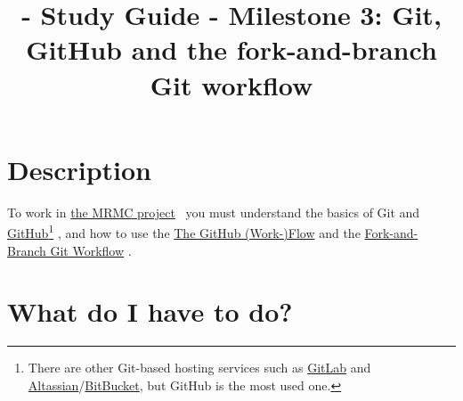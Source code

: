 
\title{\SM{} - Study Guide - Milestone 3: Git, GitHub and the fork-and-branch Git workflow}

\maketitle

\tableofcontents

\lstset{
  showstringspaces=false,
  upquote=true
}

\section{Description}

To work in
\href{https://github.com/Sistemas-Multimedia/MRVC}{the MRMC
  project}~\cite{MRVC} you must understand the basics of
Git \cite{Git-book} and
\href{https://github.com/}{GitHub}\footnote{There are other Git-based
hosting services such as \href{https://about.gitlab.com/}{GitLab} and
\href{https://www.atlassian.com/git}{Altassian}/\href{https://bitbucket.org/product}{BitBucket},
but GitHub is the most used one.} \cite{GitHub}, and how to use the
\href{https://guides.github.com/introduction/flow/index.html}{The
  GitHub (Work-)Flow} and the
\href{https://github.com/vicente-gonzalez-ruiz/fork_and_branch_git_workflow}{Fork-and-Branch
  Git Workflow} \cite{fork-and-branch-git-workflow}.

\section{What do I have to do?}

